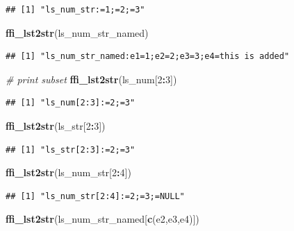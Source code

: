 \documentclass[
]{book}
\newenvironment{Shaded}{\begin{snugshade}}{\end{snugshade}}
\newcommand{\CommentTok}[1]{\textcolor[rgb]{0.56,0.35,0.01}{\textit{#1}}}
\newcommand{\DecValTok}[1]{\textcolor[rgb]{0.00,0.00,0.81}{#1}}
\newcommand{\KeywordTok}[1]{\textcolor[rgb]{0.13,0.29,0.53}{\textbf{#1}}}
\newcommand{\NormalTok}[1]{#1}
\newcommand{\OperatorTok}[1]{\textcolor[rgb]{0.81,0.36,0.00}{\textbf{#1}}}
\newcommand{\StringTok}[1]{\textcolor[rgb]{0.31,0.60,0.02}{#1}}
\begin{document}
\begin{verbatim}
## [1] "ls_num_str:=1;=2;=3"
\end{verbatim}

\begin{Shaded}
\begin{Highlighting}[]
\KeywordTok{ffi\_lst2str}\NormalTok{(ls\_num\_str\_named)}
\end{Highlighting}
\end{Shaded}

\begin{verbatim}
## [1] "ls_num_str_named:e1=1;e2=2;e3=3;e4=this is added"
\end{verbatim}

\begin{Shaded}
\begin{Highlighting}[]
\CommentTok{\# print subset}
\KeywordTok{ffi\_lst2str}\NormalTok{(ls\_num[}\DecValTok{2}\OperatorTok{:}\DecValTok{3}\NormalTok{])}
\end{Highlighting}
\end{Shaded}

\begin{verbatim}
## [1] "ls_num[2:3]:=2;=3"
\end{verbatim}

\begin{Shaded}
\begin{Highlighting}[]
\KeywordTok{ffi\_lst2str}\NormalTok{(ls\_str[}\DecValTok{2}\OperatorTok{:}\DecValTok{3}\NormalTok{])}
\end{Highlighting}
\end{Shaded}

\begin{verbatim}
## [1] "ls_str[2:3]:=2;=3"
\end{verbatim}

\begin{Shaded}
\begin{Highlighting}[]
\KeywordTok{ffi\_lst2str}\NormalTok{(ls\_num\_str[}\DecValTok{2}\OperatorTok{:}\DecValTok{4}\NormalTok{])}
\end{Highlighting}
\end{Shaded}

\begin{verbatim}
## [1] "ls_num_str[2:4]:=2;=3;=NULL"
\end{verbatim}

\begin{Shaded}
\begin{Highlighting}[]
\KeywordTok{ffi\_lst2str}\NormalTok{(ls\_num\_str\_named[}\KeywordTok{c}\NormalTok{(}\StringTok{\textquotesingle{}e2\textquotesingle{}}\NormalTok{,}\StringTok{\textquotesingle{}e3\textquotesingle{}}\NormalTok{,}\StringTok{\textquotesingle{}e4\textquotesingle{}}\NormalTok{)])}
\end{Highlighting}
\end{Shaded}
\end{document}
